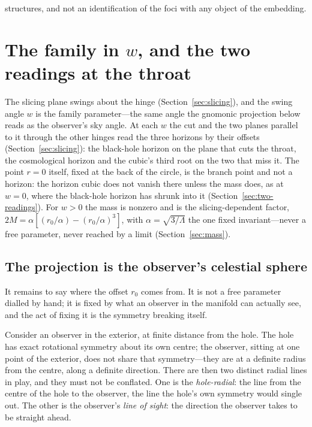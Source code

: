 \documentclass[11pt,a4paper]{article}
\theoremstyle{definition}
\begin{document}
structures, and not an identification of the foci with any object of the embedding.

\section{The family in $w$, and the two readings at the throat}\label{sec:family}

The slicing plane swings about the hinge (Section~\ref{sec:slicing}), and the swing angle $w$ is the family parameter---the same angle the gnomonic projection below reads as the observer's sky angle. At each $w$ the cut and the two planes parallel to it through the other hinges read the three horizons by their offsets (Section~\ref{sec:slicing}): the black-hole horizon on the plane that cuts the throat, the cosmological horizon and the cubic's third root on the two that miss it. The point $r=0$ itself, fixed at the back of the circle, is the branch point and not a horizon: the horizon cubic does not vanish there unless the mass does, as at $w=0$, where the black-hole horizon has shrunk into it (Section~\ref{sec:two-readings}). For $w>0$ the mass is nonzero and is the slicing-dependent factor, $2M=\alpha[(r_{0}/\alpha)-(r_{0}/\alpha)^{3}]$, with $\alpha=\sqrt{3/\Lambda}$ the one fixed invariant---never a free parameter, never reached by a limit (Section~\ref{sec:mass}).

\subsection{The projection is the observer's celestial sphere}\label{sec:projection}

It remains to say where the offset $r_{0}$ comes from. It is not a free parameter dialled by hand; it is fixed by what an observer in the manifold can actually see, and the act of fixing it is the symmetry breaking itself.

Consider an observer in the exterior, at finite distance from the hole. The hole has exact rotational symmetry about its own centre; the observer, sitting at one point of the exterior, does not share that symmetry---they are at a definite radius from the centre, along a definite direction. There are then two distinct radial lines in play, and they must not be conflated. One is the \emph{hole-radial}: the line from the centre of the hole to the observer, the line the hole's own symmetry would single out. The other is the observer's \emph{line of sight}: the direction the observer takes to be straight ahead.
\end{document}
